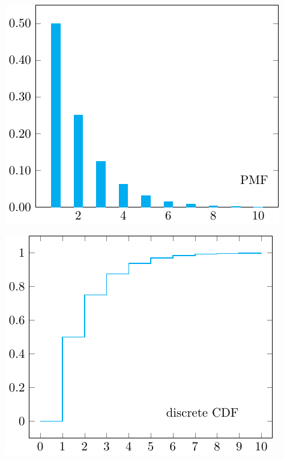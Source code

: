 \begin{minipage}{0.5\textwidth}
    \centering
    \includegraphics{Figures/PMF-visual.pdf}
\end{minipage}
\begin{minipage}{0.5\textwidth}
    \centering
    \includegraphics{Figures/discrete-CDF-visual.pdf}
\end{minipage}

